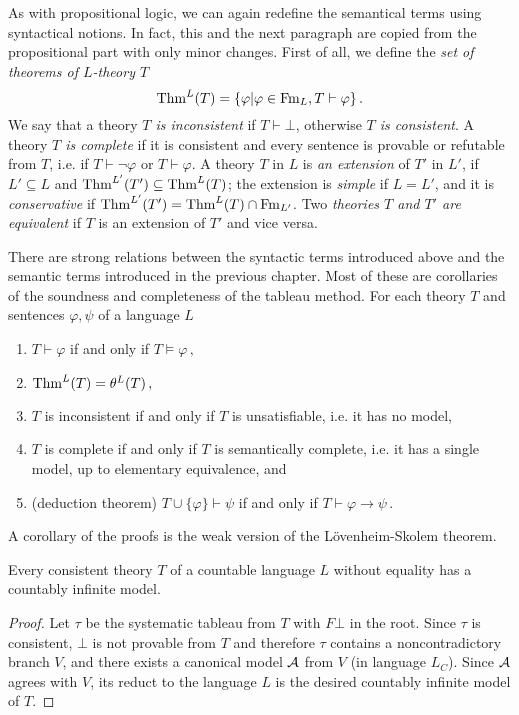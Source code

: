 As with propositional logic, we can again redefine the semantical terms using syntactical notions. In fact, this and the next paragraph are copied from the propositional part with only minor changes. First of all, we define the \emph{set of theorems of $L$-theory $T$} $$\operatorname{Thm}^L(T) = \{\varphi | \varphi \in \operatorname{Fm}_L, T \vdash \varphi\}\,.$$ We say that a theory \emph{$T$ is inconsistent} if $T \vdash \bot$, otherwise \emph{$T$ is consistent}. A theory \emph{$T$ is complete} if it is consistent and every sentence is provable or refutable from $T$, i.e. if $T \vdash \neg \varphi$ or $T \vdash \varphi$. A theory $T$ in $L$ is \emph{an extension} of $T'$ in $L'$, if $L' \subseteq L$ and $\operatorname{Thm}^{L'}(T') \subseteq \operatorname{Thm}^{L}(T)$; the extension is \emph{simple} if $L = L'$, and it is \emph{conservative} if $\operatorname{Thm}^{L'}(T') = \operatorname{Thm}^{L}(T) \cap \operatorname{Fm}_{L'}$. Two \emph{theories $T$ and $T'$ are equivalent} if $T$ is an extension of $T'$ and vice versa.

There are strong relations between the syntactic terms introduced above and the semantic terms introduced in the previous chapter. Most of these are corollaries of the soundness and completeness of the tableau method. For each theory $T$ and sentences $\varphi, \psi$ of a language $L$ 
\begin{enumerate}
	\item $T \vdash \varphi$ if and only if $T \vDash \varphi\,,$
	\item $\operatorname{Thm}^L(T) = \theta^L(T)\,,$
	\item $T$ is inconsistent if and only if $T$ is unsatisfiable, i.e. it has no model,
	\item $T$ is complete if and only if $T$ is semantically complete, i.e. it has a single model, up to elementary equivalence, and
	\item (deduction theorem) $T \cup \{\varphi\} \vdash \psi$ if and only if $T \vdash \varphi \to \psi\,.$
\end{enumerate}

A corollary of the proofs is the weak version of the Lövenheim-Skolem theorem.

\begin{theorem}
Every consistent theory $T$ of a countable language $L$ without equality has a countably infinite model.
\end{theorem}
\begin{proof}
Let $\tau$ be the systematic tableau from $T$ with $F\bot$ in the root. Since $\tau$ is consistent, $\bot$ is not provable from $T$ and therefore $\tau$ contains a noncontradictory branch $V$, and there exists a canonical model $\mathcal{A}$ from $V$ (in language $L_C$). Since $\mathcal{A}$ agrees with $V$, its reduct to the language $L$ is the desired countably infinite model of $T$.
\end{proof}

